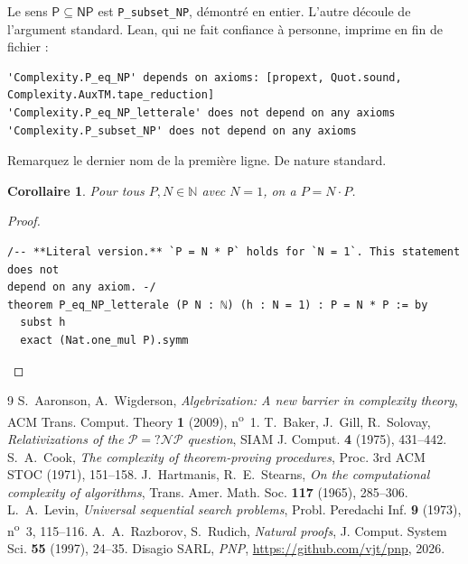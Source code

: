 \documentclass[11pt,a4paper]{amsart}
\newtheorem{corollario}[teorema]{Corollaire}
\theoremstyle{remark}
\begin{document}
Le sens $\mathsf{P} \subseteq \mathsf{NP}$ est \texttt{P\_subset\_NP},
démontré en entier. L'autre découle de l'argument standard. Lean, qui ne fait
confiance à personne, imprime en fin de fichier :

\begin{listato}[\scriptsize]
\begin{verbatim}
'Complexity.P_eq_NP' depends on axioms: [propext, Quot.sound, Complexity.AuxTM.tape_reduction]
'Complexity.P_eq_NP_letterale' does not depend on any axioms
'Complexity.P_subset_NP' does not depend on any axioms
\end{verbatim}
\end{listato}

\noindent Remarquez le dernier nom de la première ligne. De nature standard.

\begin{corollario}\label{cor:lett}
Pour tous $P, N \in \mathbb{N}$ avec $N = 1$, on a $P = N \cdot P$.
\end{corollario}

\begin{proof}
\begin{listato}
\begin{verbatim}
/-- **Literal version.** `P = N * P` holds for `N = 1`. This statement does not
depend on any axiom. -/
theorem P_eq_NP_letterale (P N : ℕ) (h : N = 1) : P = N * P := by
  subst h
  exact (Nat.one_mul P).symm
\end{verbatim}
\end{listato}
\end{proof}

\begin{thebibliography}{9}
 S.~Aaronson, A.~Wigderson,
  \emph{Algebrization: A new barrier in complexity theory},
  ACM Trans. Comput. Theory \textbf{1} (2009), n\textsuperscript{o}~1.
 T.~Baker, J.~Gill, R.~Solovay,
  \emph{Relativizations of the $\mathcal{P} =? \mathcal{NP}$ question},
  SIAM J. Comput. \textbf{4} (1975), 431--442.
 S.~A.~Cook,
  \emph{The complexity of theorem-proving procedures},
  Proc. 3rd ACM STOC (1971), 151--158.
 J.~Hartmanis, R.~E.~Stearns,
  \emph{On the computational complexity of algorithms},
  Trans. Amer. Math. Soc. \textbf{117} (1965), 285--306.
 L.~A.~Levin,
  \emph{Universal sequential search problems},
  Probl. Peredachi Inf. \textbf{9} (1973), n\textsuperscript{o}~3, 115--116.
 A.~A.~Razborov, S.~Rudich,
  \emph{Natural proofs},
  J. Comput. System Sci. \textbf{55} (1997), 24--35.
 Disagio SARL,
  \emph{PNP}, \url{https://github.com/vjt/pnp}, 2026.
\end{thebibliography}
\end{document}
